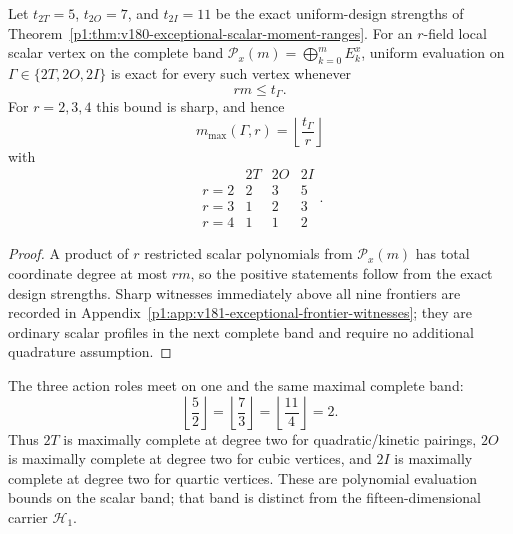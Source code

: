 \documentclass[11pt]{article}
\begin{document}
\begin{theorem}
\label{p1:thm:v181-exceptional-complete-band-frontier}
Let $t_{2T}=5$, $t_{2O}=7$, and $t_{2I}=11$ be the exact uniform-design
strengths of Theorem~\ref{p1:thm:v180-exceptional-scalar-moment-ranges}.
For an $r$-field local scalar vertex on the complete band
$\mathcal P_x(m)=\bigoplus_{k=0}^mE_k^x$, uniform evaluation on
$\Gamma\in\{2T,2O,2I\}$ is exact for every such vertex whenever
\[
 rm\le t_\Gamma.
\]
For $r=2,3,4$ this bound is sharp, and hence
\[
 \boxed{m_{\max}(\Gamma,r)=\left\lfloor\frac{t_\Gamma}{r}\right\rfloor}
\]
with
\[
\begin{array}{c|ccc}
 &2T&2O&2I\\ \hline
 r=2&2&3&5\\
 r=3&1&2&3\\
 r=4&1&1&2
\end{array}.
\]
\end{theorem}
\begin{proof}
A product of $r$ restricted scalar polynomials from $\mathcal P_x(m)$ has
total coordinate degree at most $rm$, so the positive statements follow
from the exact design strengths.  Sharp witnesses immediately above all nine
frontiers are recorded in Appendix~\ref{p1:app:v181-exceptional-frontier-witnesses};
they are ordinary scalar profiles in the next complete band and require no
additional quadrature assumption.
\end{proof}

\begin{corollary}
\label{p1:cor:v181-exceptional-common-degree-two-saturation}
The three action roles meet on one and the same maximal complete band:
\[
 \boxed{
 \left\lfloor\frac52\right\rfloor
 =\left\lfloor\frac73\right\rfloor
 =\left\lfloor\frac{11}{4}\right\rfloor=2.}
\]
Thus $2T$ is maximally complete at degree two for quadratic/kinetic pairings,
$2O$ is maximally complete at degree two for cubic vertices, and $2I$ is
maximally complete at degree two for quartic vertices. These are polynomial
evaluation bounds on the scalar band; that band is distinct from the
fifteen-dimensional carrier $\mathcal H_1$.
\end{corollary}
\end{document}
